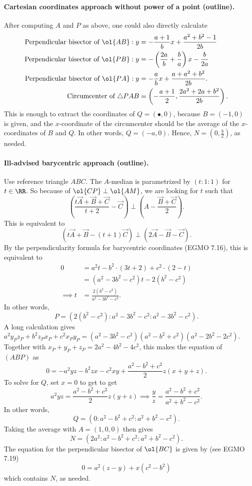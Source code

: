 \documentclass[11pt]{scrartcl}
\begin{document}
\paragraph{Cartesian coordinates approach without power of a point (outline).}
After computing $A$ and $P$ as above, one could also directly calculate
\begin{align*}
  \text{Perpendicular bisector of $\ol{AB}$}:
    y &= -\frac{a+1}{b} x + \frac{a^2+b^2-1}{2b} \\
  \text{Perpendicular bisector of $\ol{PB}$}:
    y &= - \left( \frac{2a}{b} + \frac{b}{a} \right) x - \frac{b}{2a} \\
  \text{Perpendicular bisector of $\ol{PA}$}:
    y &= - \frac{a}{b} x + \frac{a+a^2+b^2}{2b}. \\
  \text{Circumcenter of $\triangle PAB$}
    &= \left( -\frac{a+1}{2}, \frac{2a^2+2a+b^2}{2b} \right).
\end{align*}
This is enough to extract the coordinates of $Q = (\bullet, 0)$,
because $B = (-1,0)$ is given, and the $x$-coordinate
of the circumcenter should be the average of the $x$-coordinates of $B$ and $Q$.
In other words, $Q = (-a,0)$.
Hence, $N = \left( 0, \frac b2 \right)$, as needed.

\paragraph{Ill-advised barycentric approach (outline).}
Use reference triangle $ABC$.
The $A$-median is parametrized by $(t:1:1)$ for $t \in \RR$.
So because of $\ol{CP} \perp \ol{AM}$, we are looking for $t$ such that
\[
  \left( \frac{t \vec A + \vec B + \vec C}{t+2} - \vec C \right)
  \perp \left( A - \frac{\vec B + \vec C}{2} \right).
\]
This is equivalent to
\[
  \left( t \vec A + \vec B - (t+1) \vec C \right)
  \perp \left( 2 \vec A - \vec B - \vec C \right).
\]
By the perpendicularity formula for barycentric coordinates (EGMO 7.16),
this is equivalent to
\begin{align*}
  0 &= a^2t - b^2 \cdot (3t+2) + c^2 \cdot (2-t) \\
  &= \left( a^2-3b^2-c^2 \right) t - 2(b^2-c^2) \\
  \implies t &= \frac{2(b^2-c^2)}{a^2-3b^2-c^2}.
\end{align*}
In other words,
\[ P = \left( 2(b^2-c^2) : a^2-3b^2-c^2 : a^2-3b^2-c^2 \right). \]
A long calculation gives
$a^2 y_P z_P + b^2 z_P x_P + c^2 x_P y_P
= (a^2-3b^2-c^2)(a^2-b^2+c^2)(a^2-2b^2-2c^2)$.
Together with $x_P+y_P+z_P=2a^2-4b^2-4c^2$,
this makes the equation of $(ABP)$ as
\[
  0=-a^2yz-b^2zx-c^2xy
  + \frac{a^2-b^2+c^2}{2} z(x+y+z).
\]
To solve for $Q$, set $x=0$ to get to get
\[ a^2yz = \frac{a^2-b^2+c^2}{2} z(y+z)
  \implies \frac yz = \frac{a^2-b^2+c^2}{a^2+b^2-c^2}. \]
In other words,
\[ Q = \left(  0 : a^2-b^2+c^2 : a^2+b^2-c^2 \right). \]
Taking the average with $A = (1,0,0)$ then gives
\[ N = \left(  2a^2 : a^2-b^2+c^2 : a^2+b^2-c^2 \right). \]
The equation for the perpendicular bisector of $\ol{BC}$
is given by (see EGMO 7.19)
\[ 0 = a^2(z-y)+x(c^2-b^2) \]
which contains $N$, as needed.
\end{document}
